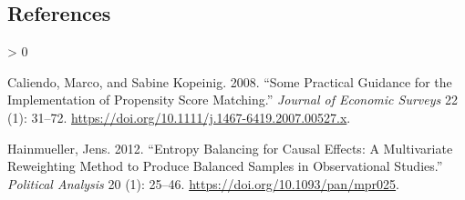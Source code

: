 \documentclass[
  12pt,
]{article}
\newlength{\cslhangindent}
\newenvironment{CSLReferences}[2] %
 {%
  \setlength{\parindent}{0pt}
  \ifodd #1 \everypar{\setlength{\hangindent}{\cslhangindent}}\ignorespaces\fi
  \ifnum #2 > 0
  \setlength{\parskip}{#2\baselineskip}
  \fi
 }%
 {}
\begin{document}
\begin{singlespace}

\end{singlespace}

\newpage

\hypertarget{references}{%
\subsection*{References}\label{references}}

\hypertarget{refs}{}
\begin{CSLReferences}{1}{0}
\leavevmode\hypertarget{ref-Caliendo2008}{}%
Caliendo, Marco, and Sabine Kopeinig. 2008. {``Some {Practical Guidance} for the {Implementation} of {Propensity Score Matching}.''} \emph{Journal of Economic Surveys} 22 (1): 31--72. \url{https://doi.org/10.1111/j.1467-6419.2007.00527.x}.

\leavevmode\hypertarget{ref-Hainmueller2012}{}%
Hainmueller, Jens. 2012. {``Entropy {Balancing} for {Causal Effects}: {A Multivariate Reweighting Method} to {Produce Balanced Samples} in {Observational Studies}.''} \emph{Political Analysis} 20 (1): 25--46. \url{https://doi.org/10.1093/pan/mpr025}.

\end{CSLReferences}
\end{document}
